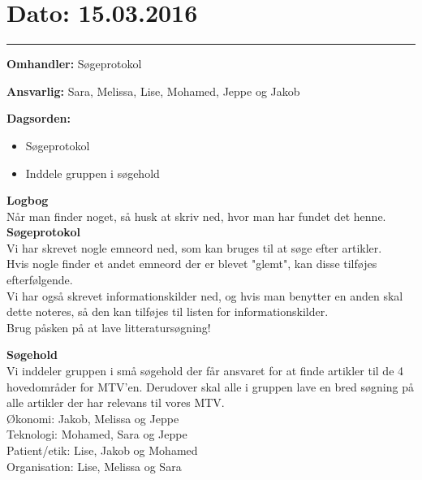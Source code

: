 \section{Dato: 15.03.2016}
\hrule

\textbf{Omhandler:} Søgeprotokol

\textbf{Ansvarlig:} Sara, Melissa, Lise, Mohamed, Jeppe og Jakob

\textbf{Dagsorden:}
\begin{itemize}
	\item Søgeprotokol
	\item Inddele gruppen i søgehold
\end{itemize}

\textbf{Logbog}
\\
Når man finder noget, så husk at skriv ned, hvor man har fundet det henne. \\

\textbf{Søgeprotokol}
\\
Vi har skrevet nogle emneord ned, som kan bruges til at søge efter artikler. \\
Hvis nogle finder et andet emneord der er blevet "glemt", kan disse tilføjes efterfølgende.\\
Vi har også skrevet informationskilder ned, og hvis man benytter en anden skal dette noteres, så den kan tilføjes til listen for informationskilder.\\
Brug påsken på at lave litteratursøgning!

\textbf{Søgehold}
\\
Vi inddeler gruppen i små søgehold der får ansvaret for at finde artikler til de 4 hovedområder for MTV'en.
Derudover skal alle i gruppen lave en bred søgning på alle artikler der har relevans til vores MTV.\\
Økonomi: Jakob, Melissa og Jeppe\\
Teknologi: Mohamed, Sara og Jeppe\\
Patient/etik: Lise, Jakob og Mohamed\\
Organisation: Lise, Melissa og Sara \\
\\
\\
